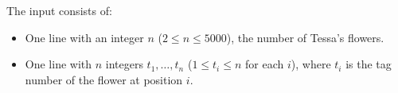 
    The input consists of:
    \begin{itemize}
        \item One line with an integer $n$ ($2 \leq n \leq 5000$), the number of Tessa's flowers.
        \item One line with $n$ integers $t_1, \ldots, t_n$ ($1 \leq t_i \leq n$ for each $i$), where $t_i$ is the tag number of the flower at position $i$.
    \end{itemize}
